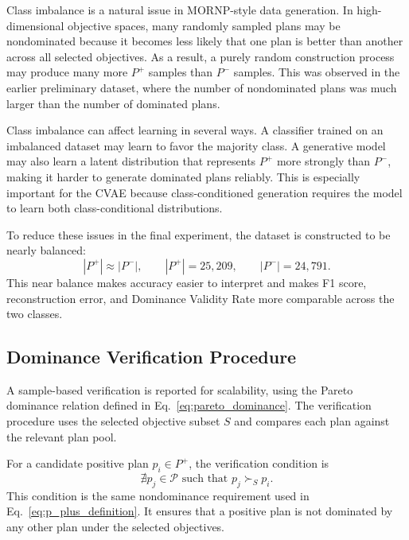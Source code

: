 Class imbalance is a natural issue in MORNP-style data generation. In high-dimensional objective spaces, many randomly sampled plans may be nondominated because it becomes less likely that one plan is better than another across all selected objectives. As a result, a purely random construction process may produce many more $P^{+}$ samples than $P^{-}$ samples. This was observed in the earlier preliminary dataset, where the number of nondominated plans was much larger than the number of dominated plans.

Class imbalance can affect learning in several ways. A classifier trained on an imbalanced dataset may learn to favor the majority class. A generative model may also learn a latent distribution that represents $P^{+}$ more strongly than $P^{-}$, making it harder to generate dominated plans reliably. This is especially important for the CVAE because class-conditioned generation requires the model to learn both class-conditional distributions.

To reduce these issues in the final experiment, the dataset is constructed to be nearly balanced:
\begin{equation}
    |P^{+}| \approx |P^{-}|,
    \qquad
    |P^{+}| = 25{,}209,
    \qquad
    |P^{-}| = 24{,}791.
    \label{eq:balanced_class_condition}
\end{equation}
This near balance makes accuracy easier to interpret and makes F1 score, reconstruction error, and Dominance Validity Rate more comparable across the two classes.

\subsection{Dominance Verification Procedure}
\label{subsec:dominance_verification_procedure}

A sample-based verification is reported for scalability, using the Pareto dominance relation defined in Eq.~\eqref{eq:pareto_dominance}. The verification procedure uses the selected objective subset $S$ and compares each plan against the relevant plan pool.

For a candidate positive plan $p_i \in P^{+}$, the verification condition is
\begin{equation}
    \nexists p_j \in \mathcal{P}
    \text{ such that }
    p_j \succ_S p_i.
    \label{eq:positive_verification_condition}
\end{equation}
This condition is the same nondominance requirement used in Eq.~\eqref{eq:p_plus_definition}. It ensures that a positive plan is not dominated by any other plan under the selected objectives.

